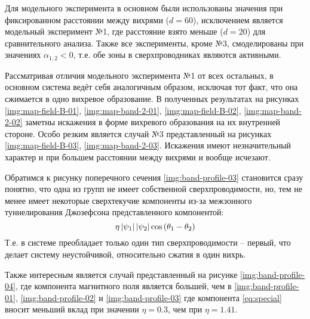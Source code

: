 \clearpage

Для модельного эксперимента в основном были использованы значения при 
фиксированном расстоянии между вихрями (\( d = 60 \)), исключением является 
модельный эксперимент №1, где расстояние взято меньше (\( d = 20 \)) для 
сравнительного анализа. Также все эксперименты, кроме №3, смоделированы при 
значениях \( \alpha_{1,2} < 0 \), т.е. обе зоны в сверхпроводниках являются 
активными.

Рассматривая отличия модельного эксперимента №1 от всех остальных, в основном 
система ведёт себя аналогичным образом, исключая тот факт, что она сжимается 
в одно вихревое образование. В полученных результатах на рисунках 
\ref{img:map-field-B-01}, \ref{img:map-band-2-01}, \ref{img:map-field-B-02}, 
\ref{img:map-band-2-02} заметны искажения в форме вихревого образования на их 
внутренней стороне. Особо резким является случай №3 представленный на рисунках 
\ref{img:map-field-B-03}, \ref{img:map-band-2-03}. Искажения имеют 
незначительный характер и при большем расстоянии между вихрями и вообще 
исчезают. 

Обратимся к рисунку поперечного сечения \ref{img:band-profile-03} становится 
сразу понятно, что одна из групп не имеет собственной сверхпроводимости, но, 
тем не менее имеет некоторые сверхтекучие компоненты из-за межзонного 
туннелирования Джозефсона представленного компонентой:
\begin{equation} 
    \eta\left| \psi_1 \right|\left| \psi_2 \right|\cos\left( \theta_1 - \theta_2 \right)
    \label{eq:special}
\end{equation}
Т.е. в системе преобладает только один тип сверхпроводимости -- первый, что 
делает систему неустойчивой, относительно сжатия в один вихрь. 

Также интересным является случай представленный на рисунке 
\ref{img:band-profile-04}, где компонента магнитного поля является большей, 
чем в \ref{img:band-profile-01}, \ref{img:band-profile-02} и 
\ref{img:band-profile-03} где компонента \eqref{eq:special} вносит меньший
вклад при значении \( \eta = 0.3 \), чем при \( \eta = 1.41 \).

\newpage